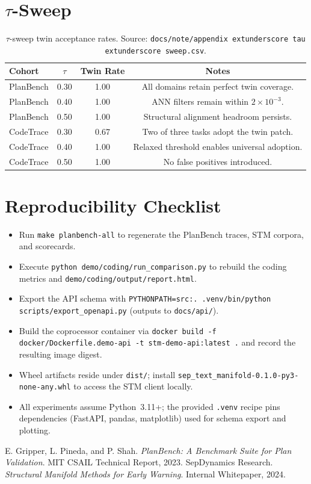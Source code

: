 \documentclass[11pt]{article}
\begin{document}
\section{\texorpdfstring{$\tau$}{tau}-Sweep}
\label{app:tau}
\begin{table}[h]
  \centering
  \caption{$\tau$-sweep twin acceptance rates. Source: \texttt{docs/note/appendix	extunderscore tau	extunderscore sweep.csv}.}
  \begin{tabular}{lccc}
    \hline
    Cohort & $\tau$ & Twin Rate & Notes\\
    \hline
    PlanBench & 0.30 & 1.00 & All domains retain perfect twin coverage.\\
    PlanBench & 0.40 & 1.00 & ANN filters remain within $2\times10^{-3}$.\\
    PlanBench & 0.50 & 1.00 & Structural alignment headroom persists.\\
    CodeTrace & 0.30 & 0.67 & Two of three tasks adopt the twin patch.\\
    CodeTrace & 0.40 & 1.00 & Relaxed threshold enables universal adoption.\\
    CodeTrace & 0.50 & 1.00 & No false positives introduced.\\
    \hline
  \end{tabular}
\end{table}

\section{Reproducibility Checklist}
\begin{itemize}
  \item Run \texttt{make planbench-all} to regenerate the PlanBench traces, STM corpora, and scorecards.
  \item Execute \texttt{python demo/coding/run\_comparison.py} to rebuild the coding metrics and \texttt{demo/coding/output/report.html}.
  \item Export the API schema with \texttt{PYTHONPATH=src:. .venv/bin/python scripts/export\_openapi.py} (outputs to \texttt{docs/api/}).
  \item Build the coprocessor container via \texttt{docker build -f docker/Dockerfile.demo-api -t stm-demo-api:latest .} and record the resulting image digest.
  \item Wheel artifacts reside under \texttt{dist/}; install \texttt{sep\_text\_manifold-0.1.0-py3-none-any.whl} to access the STM client locally.
  \item All experiments assume Python~3.11+; the provided \texttt{.venv} recipe pins dependencies (FastAPI, pandas, matplotlib) used for schema export and plotting.
\end{itemize}

\begin{thebibliography}{9}
 E. Gripper, L. Pineda, and P. Shah. \emph{PlanBench: A Benchmark Suite for Plan Validation}. MIT CSAIL Technical Report, 2023.
 SepDynamics Research. \emph{Structural Manifold Methods for Early Warning}. Internal Whitepaper, 2024.
\end{thebibliography}
\end{document}
